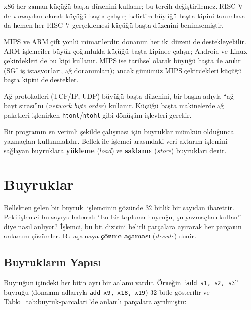 \begin{karsilastirma}
x86 her zaman küçüğü başta düzenini kullanır; bu tercih değiştirilemez. RISC-V de varsayılan olarak küçüğü başta çalışır; belirtim büyüğü başta kipini tanımlasa da hemen her RISC-V gerçeklemesi küçüğü başta düzenini benimsemiştir.

MIPS ve ARM çift yönlü mimarilerdir: donanım her iki düzeni de destekleyebilir. ARM işlemciler büyük çoğunlukla küçüğü başta kipinde çalışır; Android ve Linux çekirdekleri de bu kipi kullanır. MIPS ise tarihsel olarak büyüğü başta ile anılır (SGI iş istasyonları, ağ donanımları); ancak günümüz MIPS çekirdekleri küçüğü başta kipini de destekler.

Ağ protokolleri (TCP/IP, UDP) büyüğü başta düzenini, bir başka adıyla ``ağ bayt sırası''nı (\emph{network byte order}) kullanır. Küçüğü başta makinelerde ağ paketleri işlenirken \texttt{htonl}/\texttt{ntohl} gibi dönüşüm işlevleri gerekir.
\end{karsilastirma}

Bir programın en verimli şekilde çalışması için buyruklar mümkün olduğunca yazmaçları kullanmalıdır. Bellek ile işlemci arasındaki veri aktarım işlemini sağlayan buyruklara \textbf{yükleme} (\emph{load}) ve \textbf{saklama} (\emph{store}) buyrukları denir.


\section{Buyruklar}
\label{sec:buyruklar}

Bellekten gelen bir buyruk, işlemcinin gözünde 32 bitlik bir sayıdan ibarettir. Peki işlemci bu sayıya bakarak ``bu bir toplama buyruğu, şu yazmaçları kullan'' diye nasıl anlıyor? İşlemci, bu bit dizisini belirli parçalara ayırarak her parçanın anlamını çözümler. Bu aşamaya \textbf{çözme aşaması} (\emph{decode}) denir.

\subsection{Buyrukların Yapısı}

Buyruğun içindeki her bitin ayrı bir anlamı vardır. Örneğin ``\texttt{add s1, s2, s3}'' buyruğu (donanım adlarıyla \texttt{add x9, x18, x19}) 32 bitle gösterilir ve Tablo~\ref{tab:buyruk-parcalari}'de anlamlı parçalara ayrılmıştır:

